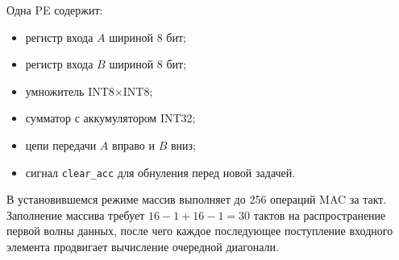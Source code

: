 \documentclass[12pt,a4paper]{article}
\begin{document}
Одна PE содержит:
\begin{itemize}
    \item регистр входа \(A\) шириной 8 бит;
    \item регистр входа \(B\) шириной 8 бит;
    \item умножитель INT8\(\times\)INT8;
    \item сумматор с аккумулятором INT32;
    \item цепи передачи \(A\) вправо и \(B\) вниз;
    \item сигнал \texttt{clear\_acc} для обнуления перед новой задачей.
\end{itemize}

В установившемся режиме массив выполняет до 256 операций MAC за такт. Заполнение массива требует \(16 - 1 + 16 - 1 = 30\) тактов на распространение первой волны данных, после чего каждое последующее поступление входного элемента продвигает вычисление очередной диагонали.
\end{document}
